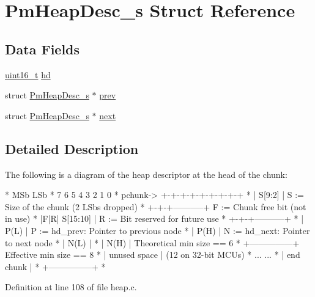 \hypertarget{struct_pm_heap_desc__s}{\section{Pm\-Heap\-Desc\-\_\-s Struct Reference}
\label{struct_pm_heap_desc__s}
}
\subsection*{Data Fields}
\begin{DoxyCompactItemize}
\item 
\hyperlink{stdint_8h_a273cf69d639a59973b6019625df33e30}{uint16\-\_\-t} \hyperlink{struct_pm_heap_desc__s_a2767ec86ed357adc57fa8cd5711e40d0}{hd}
\item 
struct \hyperlink{struct_pm_heap_desc__s}{Pm\-Heap\-Desc\-\_\-s} $\ast$ \hyperlink{struct_pm_heap_desc__s_a19e11087672adf23918da958588846f1}{prev}
\item 
struct \hyperlink{struct_pm_heap_desc__s}{Pm\-Heap\-Desc\-\_\-s} $\ast$ \hyperlink{struct_pm_heap_desc__s_a0b0227b78c1547dc5d2f9025b9c4a99c}{next}
\end{DoxyCompactItemize}


\subsection{Detailed Description}
The following is a diagram of the heap descriptor at the head of the chunk\-: \begin{DoxyVerb}*                MSb          LSb
*                7 6 5 4 3 2 1 0
*      pchunk-> +-+-+-+-+-+-+-+-+
*               |     S[9:2]    |     S := Size of the chunk (2 LSbs dropped)
*               +-+-+-----------+     F := Chunk free bit (not in use)
*               |F|R| S[15:10]  |     R := Bit reserved for future use
*               +-+-+-----------+
*               |     P(L)      |     P := hd_prev: Pointer to previous node
*               |     P(H)      |     N := hd_next: Pointer to next node
*               |     N(L)      |
*               |     N(H)      |     Theoretical min size == 6
*               +---------------+     Effective min size == 8
*               | unused space  |     (12 on 32-bit MCUs)
*               ...           ...
*               | end chunk     |
*               +---------------+
* \end{DoxyVerb}
 

Definition at line 108 of file heap.\-c.



